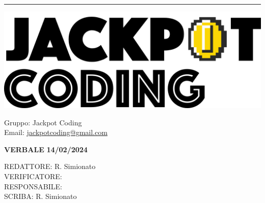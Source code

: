 \documentclass[5pt]{article}
\begin{document}
\hrule
\begin{minipage}[t]{0.50\textwidth}
    \begin{flushleft}
        \hspace{10pt}
        \includegraphics[scale=0.65]{jackpot-logo.png} 
    \end{flushleft}
\end{minipage}
\hspace{-60pt} %
\begin{flushright}
    \begin{minipage}[t]{0.50\textwidth}
        \begin{flushright}
            Gruppo: {\Large Jackpot Coding}\\
            Email: \href{mailto:jackpotcoding@gmail.com}{jackpotcoding@gmail.com}
        \end{flushright}
    \end{minipage}
\end{flushright}

\vspace{15pt}

\begin{center}
    \textbf{\large VERBALE }
    \textbf{\large 14/02/2024} \\
    \textbf{\Large}
\end{center}

\vspace{13pt}

\begin{flushleft}
    \begin{spacing}{1.5}
        REDATTORE:  R. Simionato \\
        VERIFICATORE:  \\%
        RESPONSABILE:  \\%
        \vspace{7pt}
        SCRIBA: R. Simionato\\%
    \end{spacing}
\end{flushleft}
\end{document}
